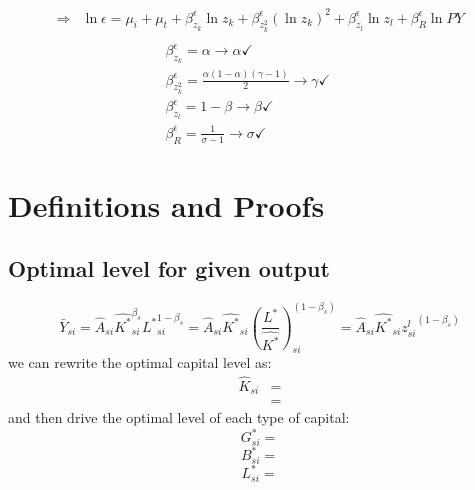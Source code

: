 \documentclass[12pt]{article} %
\begin{document}
\begin{enumerate}
\begin{equation*}
\begin{split}
            \Rightarrow& \ln \epsilon = \mu_i + \mu_t + \beta_{z_k}^{\epsilon} \ln z_k + \beta_{z_k^2}^{\epsilon} (\ln z_k)^2 + \beta_{z_l}^{\epsilon} \ln z_l + \beta_{R}^{\epsilon} \ln PY  \\\\
            &     \qquad\qquad\qquad        \beta_{z_k}^{\epsilon} = \alpha \rightarrow \alpha \checkmark\\
            &     \qquad\qquad\qquad        \beta_{z_k^2}^{\epsilon} = \frac{\alpha(1-\alpha)(\gamma-1)}{2}\rightarrow \gamma \checkmark \\
            &     \qquad\qquad\qquad        \beta_{z_l}^{\epsilon} = 1-\beta \rightarrow \beta\checkmark\\
            &     \qquad\qquad\qquad        \beta_{R}^{\epsilon} = \frac{1}{\sigma -1} \rightarrow \sigma \checkmark
        \end{split}
    \end{equation*}



    
\end{enumerate}

\clearpage

\section{Definitions and Proofs} 
\subsection{Optimal level for given output} \label{Ap:optimal level for given output}
\begin{equation*}
    \bar{Y}_{si} = \hat{A}_{si} \hat{K^*}_{si}^{\beta_s} {L^*}_{si}^{1-\beta_s} = \hat{A}_{si} \hat{K^*}_{si} ({\frac{L^*}{\hat{K^*}}})_{si}^{(1-\beta_s)}= \hat{A}_{si} \hat{K^*}_{si} {z_{si}^l}^{(1-\beta_s)}
\end{equation*}
we can rewrite the optimal capital level as:
\begin{equation*}
    \begin{split}
        \hat{K}_{si} &= \\
        & = 
    \end{split}
\end{equation*}
and then drive the optimal level of each type of capital:
\begin{equation*}
    G_{si}^* = 
\end{equation*}
\begin{equation*}
    B_{si}^* = 
\end{equation*}
\begin{equation*}
    L_{si}^* = 
\end{equation*}
\end{document}
